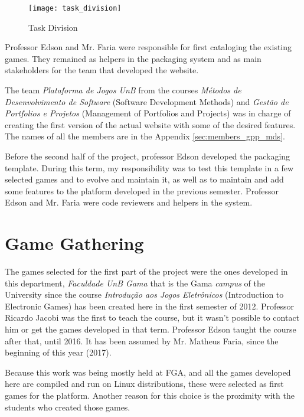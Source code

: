 \begin{figure}[h!]
\centering
\texttt{[image: task\_division]}
\caption{Task Division}
\label{fig:task_division}
\end{figure}

Professor Edson and Mr. Faria were responsible for first cataloging the existing games. They remained as helpers in the packaging system and as main stakeholders for the team that developed the website.

The team \textit{Plataforma de Jogos UnB} from the courses \textit{M\'etodos de Desenvolvimento de Software} (Software Development Methods) and \textit{Gest\~ao de Portfolios e Projetos} (Management of Portfolios and Projects) was in charge of creating the first version of the actual website with some of the  desired features. The names of all the members are in the Appendix \ref{sec:members_gpp_mds}.

Before the second half of the project, professor Edson developed the packaging template. During this term, my responsibility was to test this template in a few selected games and to evolve and maintain it, as well as to maintain and add some features to the platform developed in the previous semester. Professor Edson and Mr. Faria were code reviewers and helpers in the system.


\section{Game Gathering}
\label{sec:game_gathering}

The games selected for the first part of the project were the ones developed in this department, \textit{Faculdade UnB Gama} that is the Gama \textit{campus} of the University since the course \textit{Introdu\c{c}\~ao aos Jogos Eletr\^onicos} (Introduction to Electronic Games) has been created here in the first semester of 2012. Professor Ricardo Jacobi was the first to teach the course, but it wasn't possible to contact him or get the games developed in that term. Professor Edson taught the course after that, until 2016. It has been assumed by Mr. Matheus Faria, since the beginning of this year (2017).

Because this work was being mostly held at FGA, and all the games developed here are compiled and run on Linux distributions, these were selected as first games for the platform. Another reason for this choice is the proximity with the students who created those games.

